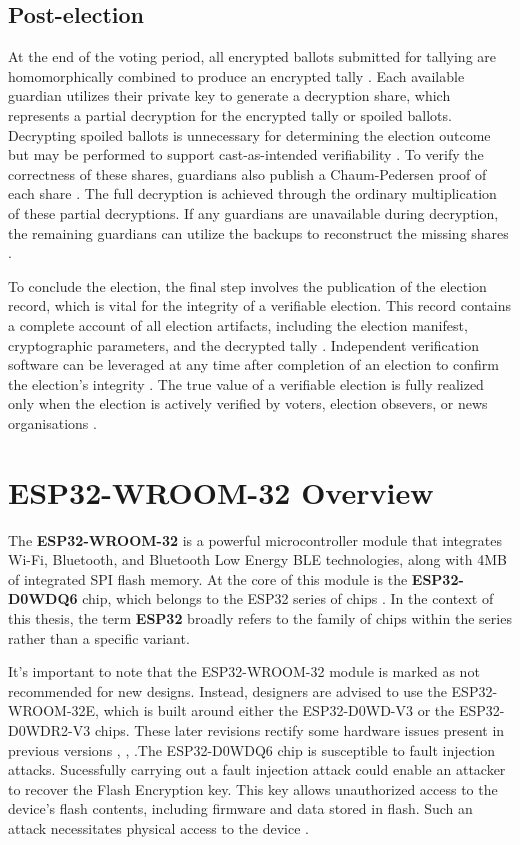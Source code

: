\subsection{Post-election}
At the end of the voting period, all encrypted ballots submitted for tallying are homomorphically combined to produce an encrypted tally \cite[5,18]{eg-spec} \cite[15]{eg-paper}. Each available guardian utilizes their private key to generate a decryption share, which represents a partial decryption for the encrypted tally or spoiled ballots. Decrypting spoiled ballots is unnecessary for determining the election outcome but may be performed to support cast-as-intended verifiability \cite[15,17]{eg-paper} \cite[18]{eg-spec}. To verify the correctness of these shares, guardians also publish a Chaum-Pedersen proof of each share \cite[18]{eg-spec}. The full decryption is achieved through the ordinary multiplication of these partial decryptions. If any guardians are unavailable during decryption, the remaining guardians can utilize the backups to reconstruct the missing shares \cite{eg-docs}.

To conclude the election, the final step involves the publication of the election record, which is vital for the integrity of a verifiable election. This record contains a complete account of all election artifacts, including the election manifest, cryptographic parameters, and the decrypted tally \cite[24]{eg-spec}. Independent verification software can be leveraged at any time after completion of an election to confirm the election's integrity \cite[6]{eg-paper}. The true value of a verifiable election is fully realized only when the election is actively verified by voters, election obsevers, or news organisations \cite[17]{eg-spec}. 


\section{ESP32-WROOM-32 Overview}
The \textbf{ESP32-WROOM-32} is a powerful microcontroller module that integrates Wi-Fi, Bluetooth, and Bluetooth Low Energy \ac{BLE} technologies, along with 4MB of integrated SPI flash memory. At the core of this module is the \textbf{ESP32-D0WDQ6} chip, which belongs to the ESP32 series of chips  \cite[6]{esp32-module}. In the context of this thesis, the term \textbf{ESP32} broadly refers to the family of chips within the series rather than a specific variant. 

It's important to note that the ESP32-WROOM-32 module is marked as not recommended for new designs. Instead, designers are advised to use the ESP32-WROOM-32E, which is built around either the ESP32-D0WD-V3 or the ESP32-D0WDR2-V3 chips. These later revisions rectify some hardware issues present in previous versions \cite[1]{esp32-module-new}, \cite[11]{esp32-series}, \cite[3-4]{esp32-errata}.The ESP32-D0WDQ6 chip is susceptible to fault injection attacks. Sucessfully carrying out a fault injection attack could enable an attacker to recover the Flash Encryption key. This key allows unauthorized access to the device's flash contents, including firmware and data stored in flash. Such an attack necessitates physical access to the device \cite{chip-revision}. 

